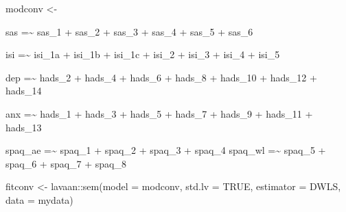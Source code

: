 \documentclass[
  letterpaper,
  DIV=11,
  numbers=noendperiod]{scrreprt}
\newenvironment{Shaded}{\begin{snugshade}}{\end{snugshade}}
\newcommand{\AttributeTok}[1]{\textcolor[rgb]{0.40,0.45,0.13}{#1}}
\newcommand{\ConstantTok}[1]{\textcolor[rgb]{0.56,0.35,0.01}{#1}}
\newcommand{\FunctionTok}[1]{\textcolor[rgb]{0.28,0.35,0.67}{#1}}
\newcommand{\NormalTok}[1]{\textcolor[rgb]{0.00,0.23,0.31}{#1}}
\newcommand{\OtherTok}[1]{\textcolor[rgb]{0.00,0.23,0.31}{#1}}
\newcommand{\SpecialCharTok}[1]{\textcolor[rgb]{0.37,0.37,0.37}{#1}}
\newcommand{\StringTok}[1]{\textcolor[rgb]{0.13,0.47,0.30}{#1}}
\begin{document}
\begin{Shaded}
\begin{Highlighting}[]
\NormalTok{modconv }\OtherTok{\textless{}{-}} \StringTok{\textquotesingle{}}

\StringTok{sas =\textasciitilde{} sas\_1 + sas\_2 + sas\_3 + sas\_4 + sas\_5 + sas\_6}

\StringTok{isi =\textasciitilde{} isi\_1a + isi\_1b + isi\_1c + isi\_2 + isi\_3 + isi\_4 + isi\_5}

\StringTok{dep =\textasciitilde{} hads\_2 + hads\_4 + hads\_6 + hads\_8 + hads\_10 + hads\_12 + hads\_14}

\StringTok{anx =\textasciitilde{} hads\_1 + hads\_3 + hads\_5 + hads\_7 + hads\_9 + hads\_11 + hads\_13}

\StringTok{spaq\_ae =\textasciitilde{} spaq\_1 + spaq\_2 + spaq\_3 + spaq\_4 }
\StringTok{spaq\_wl =\textasciitilde{} spaq\_5 + spaq\_6 + spaq\_7 + spaq\_8 }

\StringTok{\textquotesingle{}}

\NormalTok{fitconv }\OtherTok{\textless{}{-}}\NormalTok{ lavaan}\SpecialCharTok{::}\FunctionTok{sem}\NormalTok{(}\AttributeTok{model =}\NormalTok{ modconv,}
                        \AttributeTok{std.lv =} \ConstantTok{TRUE}\NormalTok{, }\AttributeTok{estimator =} \StringTok{\textquotesingle{}DWLS\textquotesingle{}}\NormalTok{, }\AttributeTok{data =}\NormalTok{ mydata)}
\end{Highlighting}
\end{Shaded}
\end{document}
